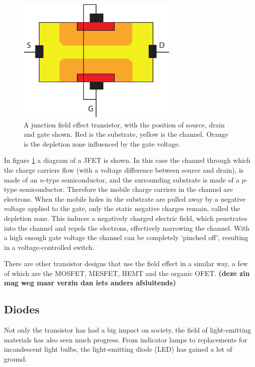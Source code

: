 \begin{figure}[!ht]
 \begin{center}
  \includegraphics[width=0.7\textwidth]{jfet}
  \caption{A junction field effect transistor, with the position of source, drain and gate shown. Red is the substrate, yellow is the channel. Orange is the depletion zone influenced by the gate voltage.}
  \label{fig:JFET}
 \end{center}
\end{figure}

In figure \ref{fig:JFET} a diagram of a JFET is shown. In this case the channel through which the charge carriers flow (with a voltage difference between source and drain), is made of an $n$-type semiconductor, and the surrounding substrate is made of a $p$-type semiconductor. Therefore the mobile charge carriers in the channel are electrons. When the mobile holes in the substrate are pulled away by a negative voltage applied to the gate, only the static negative charges remain, called the depletion zone. This induces a negatively charged electric field, which penetrates into the channel and repels the electrons, effectively narrowing the channel. With a high enough gate voltage the channel can be completely `pinched off', resulting in a voltage-controlled switch.

There are other transistor designs that use the field effect in a similar way, a few of which are the MOSFET, MESFET, HEMT and the organic OFET. \textbf{(deze zin mag weg maar verzin dan iets anders afsluitends)}

\subsection{Diodes}
Not only the transistor has had a big impact on society, the field of light-emitting materials has also seen much progress. From indicator lamps to replacements for incandescent light bulbs, the light-emitting diode (LED) has gained a lot of ground.

